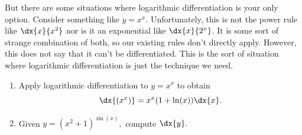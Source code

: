 But there are some situations where logarithmic
differentiation is your only option.  Consider something like $y=x^x.$ 
Unfortunately, this is not the power rule like $\dx{x}{x^2}$ nor is it an
exponential like $\dx{x}{2^x }$.  It is some sort of strange
combination of both, so our existing rules don't directly apply.
However, this does not say that it can't be differentiated.  This is
the sort of situation where logarithmic differentiation is just the
technique we need. 

\begin{embeddedproblem}
  \begin{enumerate}[label={\bf{}(\alph*)}]{}
  \item Apply logarithmic differentiation to $y=x^x$ to obtain
    $$
    \dx{(x^x) }=x^x (1+\ln(x) )\dx{x}.
    $$
  \item  Given $y=(x^2+1)^{\sin(x)},$ compute $\dx{y}.$
  \end{enumerate}
\end{embeddedproblem}









